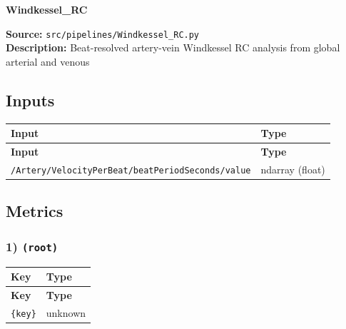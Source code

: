 \documentclass[11pt]{article}
\begin{document}
\begin{center}
\LARGE\textbf{Windkessel\_RC}
\end{center}
\textbf{Source:} \texttt{src/\allowbreak{}pipelines/\allowbreak{}Windkessel\_\allowbreak{}RC.py}\\
\textbf{Description:} Beat-resolved artery-vein Windkessel RC analysis from global arterial and venous

\subsection*{Inputs}
\begin{longtable}{|p{}|p{}|}
\hline
\textbf{Input} & \textbf{Type} \\ \hline
\endfirsthead
\hline
\textbf{Input} & \textbf{Type} \\ \hline
\endhead
\texttt{/\allowbreak{}Artery/\allowbreak{}VelocityPerBeat/\allowbreak{}beatPeriodSeconds/\allowbreak{}value} & ndarray (float) \\ \hline
\end{longtable}

\subsection*{Metrics}
\subsubsection*{1) \texttt{(root)}}
\begin{longtable}{|p{}|p{}|}
\hline
\textbf{Key} & \textbf{Type} \\ \hline
\endfirsthead
\hline
\textbf{Key} & \textbf{Type} \\ \hline
\endhead
\texttt{\{key\}} & unknown \\ \hline
\end{longtable}
\end{document}
